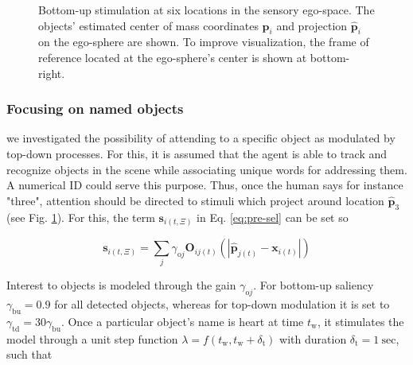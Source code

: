 \documentclass[letterpaper, 10 pt, conference]{ieeeconf}  %
\begin{document}
\begin{figure}[h!]
\begin{center}
			\caption{Bottom-up stimulation at six locations in the sensory ego-space. The objects' estimated center of mass coordinates $\mathbf{p}_i$ and projection $\mathbf{\hat{p}}_i$ on the ego-sphere are shown. To improve visualization, the frame of reference located at the ego-sphere's center is shown at bottom-right.}
			\label{fig:sim_objs}
			\end{center}
		\end{figure}
				
	\subsubsection{Focusing on named objects}
	
	we investigated the possibility of attending to a specific object as modulated by top-down processes. For this, it is assumed that the agent is able to track and recognize objects in the scene while associating unique words for addressing them. A numerical ID could serve this purpose. Thus, once the human says for instance "three", attention should be directed to stimuli which project around location $\mathbf{\hat{p}}_3$ (see Fig. \ref{fig:sim_objs}). For this, the term $\mathbf{s}_{i(t,\Xi)}$ in Eq. \eqref{eq:pre-sel} can be set so
	
	\begin{equation}
	\mathbf{s}_{i(t,\Xi)} = \sum_{j}^{} \gamma_{\mathrm{o}j}\mathbf{O}_{ij(t)}\left(|\mathbf{\hat{p}}_{j(t)} - \mathbf{x}_{i(t)}|\right)
	\label{eq:sim1}
	\end{equation}
	
	Interest to objects is modeled through the gain $\gamma_{\mathrm{o}j}$. For bottom-up saliency  $\gamma_\mathrm{bu} = 0.9$ for all detected objects, whereas for top-down modulation it is set to $\gamma_\mathrm{td} = 30\gamma_\mathrm{bu}$. Once a particular object's name is heart at time $t_\mathrm{w}$, it stimulates the model through a unit step function $\lambda = f(t_\mathrm{w}, t_\mathrm{w}+\delta_\mathrm{t})$ with duration $\delta_\mathrm{t} = 1\ \mathrm{sec}$, such that
	
\end{document}
